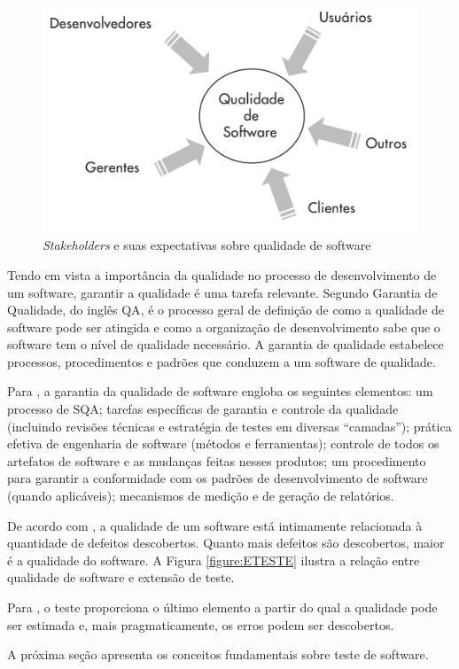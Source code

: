 \begin{figure}[!htb]
\centering
\includegraphics[width=.5\textwidth]{images/conceitoqualidade.png}
\caption{\textit{Stakeholders} e suas expectativas sobre qualidade de software  \cite{HIRAMA2011}}
\label{figure:conceitoqualidade}
\end{figure}

Tendo em vista a importância da qualidade no processo de desenvolvimento de um software, garantir a qualidade é uma tarefa relevante. Segundo  Garantia de Qualidade, do inglês \ac{QA}, é o processo geral de definição de como a qualidade de software pode ser atingida e como a organização de desenvolvimento sabe que o software tem o nível de qualidade necessário. A garantia de qualidade estabelece processos, procedimentos e padrões que conduzem a um software de qualidade. 

Para , a garantia da qualidade de software engloba os seguintes elementos: um processo de \ac{SQA}; tarefas específicas de garantia e controle da qualidade (incluindo revisões técnicas e estratégia de testes em diversas ``camadas''); prática efetiva de engenharia de software (métodos e ferramentas); controle de todos os artefatos de software e as mudanças feitas nesses produtos; um procedimento para garantir a conformidade com os padrões de desenvolvimento de software (quando aplicáveis); mecanismos de medição e de geração de relatórios.


De acordo com , a qualidade de um software está intimamente relacionada à quantidade de defeitos descobertos. Quanto mais defeitos são descobertos, maior é a qualidade do software. A Figura \ref{figure:ETESTE} ilustra a relação entre qualidade de software e extensão de teste.

Para , o teste proporciona o último elemento a partir do qual a qualidade pode ser estimada e, mais pragmaticamente, os erros podem ser descobertos.

A próxima seção apresenta os conceitos fundamentais sobre teste de software.

